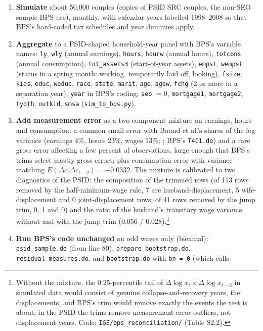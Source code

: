 \documentclass[11pt]{article}
\newcommand{\code}[1]{\texttt{#1}}
\newcommand{\1}{\mathbf{1}}
\begin{document}
\begin{enumerate}
  \item \textbf{Simulate} about 50{,}000 couples (copies of PSID SRC couples, the non-SEO sample BPS use), monthly, with
  calendar years labelled 1998--2008 so that BPS's hard-coded tax schedules and year dummies apply.
  \item \textbf{Aggregate} to a PSID-shaped household-year panel with BPS's variable names: \code{ly}, \code{wly}
  (annual earnings), \code{hours}, \code{hourw} (annual hours), \code{totcons} (annual consumption), \code{tot\_assets3}
  (start-of-year assets), \code{empst}, \code{wempst} (status in a spring month: working, temporarily laid off,
  looking), \code{fsize}, \code{kids}, \code{educ}, \code{weduc}, \code{race}, \code{state}, \code{marit}, \code{age},
  \code{agew}, \code{fchg} (2 or more in a separation year), \code{year} in BPS's coding, \code{seo} $=0$,
  \code{mortgage1}, \code{mortgage2}, \code{tyoth}, \code{outkid}, \code{smsa} (\code{sim\_to\_bps.py}).
  \item \textbf{Add measurement error} as a two-component mixture on earnings, hours and consumption: a common small error
  with Bound et al.'s shares of the log variance (earnings 4\%, hours 23\%, wages 13\%; \citealp{bound1994evidence}; BPS's
  \code{T4C1.do}) and a rare gross error affecting a few percent of observations, large enough that BPS's trims select
  mostly gross errors; plus consumption error with variance matching $E(\Delta c_t \Delta c_{t-2}) = -0.0332$. The mixture
  is calibrated to two diagnostics of the PSID: the composition of the trimmed rows (of 113 rows removed by the
  half-minimum-wage rule, 7 are husband-displacement, 5 wife-displacement and 0 joint-displacement rows; of 41 rows removed
  by the jump trim, 0, 1 and 0) and the ratio of the husband's transitory wage variance without and with the jump trim
  (0.056 / 0.028).\footnote{Without the mixture, the 0.25-percentile tail of $\Delta\log x_t \times \Delta\log x_{t-2}$ in
  simulated data would consist of genuine collapse-and-recovery years, the displacements, and BPS's trim would remove
  exactly the events the test is about; in the PSID the trims remove measurement-error outliers, not displacement years.
  Code: \code{IGE/bps\_reconciliation/} (Table S2.2).}
  \item \textbf{Run BPS's code unchanged} on odd waves only (biennial): \code{psid\_sample.do} (from line 80),
  \code{prepare\_bootstrap.do}, \code{residual\_measures.do}, and \code{bootstrap.do} with \code{bn = 0} (which calls

\end{enumerate}
\end{document}
